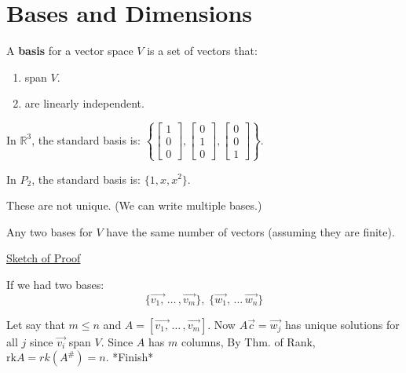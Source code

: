 \documentclass[../main.tex]{subfiles}
\begin{document}

\section{Bases and Dimensions}

\begin{definition}[Basis]
    A \textbf{basis} for a vector space \( V \) is a set of vectors that:
    \begin{enumerate}
        \item span \( V \).
        \item are linearly independent.
    \end{enumerate}
\end{definition}

\begin{example}[]
    In \( \mathbb{R}^3 \), the standard basis is:
    \( \left\{
        \begin{bmatrix} 1 \\ 0 \\ 0 \end{bmatrix},
        \begin{bmatrix} 0 \\ 1 \\ 0 \end{bmatrix},
        \begin{bmatrix} 0 \\ 0 \\ 1 \end{bmatrix}
    \right\} \).

    In \( P_2 \), the standard basis is: \( \{1,x,x^2\} \).
\end{example}

\begin{note}
    These are not unique. (We can write multiple bases.)
\end{note}

\begin{theorem}[]
    Any two bases for \( V \) have the same number of vectors (assuming they are finite).
\end{theorem}

\underline{Sketch of Proof}

If we had two bases:
\[ \{ \vec{v_1,} \, \dots \, , \vec{v_m}\}, \; \{\vec{w_1}, \, \dots \, \vec{w_n}\} \]

Let say that \( m \leq n\) and \( A = [ \vec{v_1,} \, \dots \, , \vec{v_m} ] \).
Now \( A \vec{c} = \vec{w_j} \) has unique solutions for all \( j \) since \( \vec{v_i} \) span \( V \).
Since \( A \) has \( m \) columns, 
By Thm. of Rank, \( \text{rk}A = rk(A^\#) = n \).
*Finish*
\end{document}
